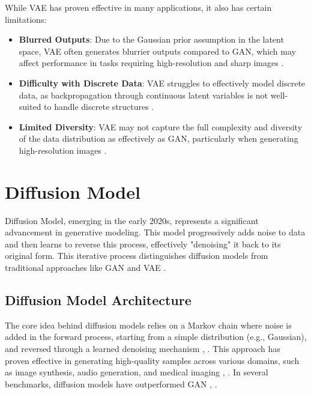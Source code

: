 While VAE has proven effective in many applications, it also has certain limitations:
\begin{itemize}
    \item \textbf{Blurred Outputs}: Due to the Gaussian prior assumption in the latent space, VAE often generates blurrier outputs compared to GAN, which may affect performance in tasks requiring high-resolution and sharp images \citep{10.1109/access.2020.2977671}.
    \item \textbf{Difficulty with Discrete Data}: VAE struggles to effectively model discrete data, as backpropagation through continuous latent variables is not well-suited to handle discrete structures \citep{10.48550/arxiv.1909.13062}.
    \item \textbf{Limited Diversity}: VAE may not capture the full complexity and diversity of the data distribution as effectively as GAN, particularly when generating high-resolution images \citep{10.48550/arxiv.2106.06500}.
\end{itemize}

\section{Diffusion Model}

Diffusion Model, emerging in the early 2020s, represents a significant advancement in generative modeling. This model progressively adds noise to data and then learns to reverse this process, effectively "denoising" it back to its original form. This iterative process distinguishes diffusion models from traditional approaches like GAN and VAE \citep{10.48550/arxiv.2105.05233}.

\subsection{Diffusion Model Architecture}

The core idea behind diffusion models relies on a Markov chain where noise is added in the forward process, starting from a simple distribution (e.g., Gaussian), and reversed through a learned denoising mechanism \citep{10.48550/arxiv.2009.09761}, \citep{10.48550/arxiv.2206.05564}. This approach has proven effective in generating high-quality samples across various domains, such as image synthesis, audio generation, and medical imaging \citep{10.48550/arxiv.2201.11972}, \citep{10.48550/arxiv.2211.00611}. In several benchmarks, diffusion models have outperformed GAN \citep{10.48550/arxiv.2105.05233}, \citep{10.48550/arxiv.2201.00308}.

